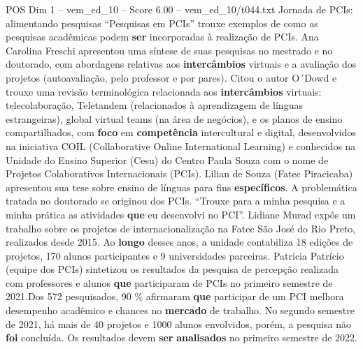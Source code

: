 \begin{textsample}{POS Dim 1 – vem\_ed\_10 – Score 6.00 – vem\_ed\_10/t044.txt}  \label{ex:f1_pos_121}
Jornada de PCIs: alimentando pesquisas “Pesquisas em PCIs” trouxe exemplos de como as pesquisas acadêmicas podem \textbf{ser} incorporadas à realização de PCIs.
Ana Carolina Freschi apresentou uma síntese de suas pesquisas no mestrado e no doutorado, com abordagens relativas aos \textbf{intercâmbios} virtuais e a avaliação dos projetos (autoavaliação, pelo professor e por pares).
Citou o autor O´Dowd e trouxe uma revisão terminológica relacionada aos \textbf{intercâmbios} virtuais: telecolaboração, Teletandem (relacionados à aprendizagem de línguas estrangeiras), global virtual teams (na área de negócios), e os planos de ensino compartilhados, com \textbf{foco} em \textbf{competência} intercultural e digital, desenvolvidos na iniciativa COIL (Collaborative Online International Learning) e conhecidos na Unidade do Ensino Superior (Cesu) do Centro Paula Souza com o nome de Projetos Colaborativos Internacionais (PCIs).
Lilian de Souza (Fatec Piracicaba) apresentou sua tese sobre ensino de línguas para fins \textbf{específicos}.
A problemática tratada no doutorado se originou dos PCIs. “Trouxe para a minha pesquisa e a minha prática as atividades \textbf{que} eu desenvolvi no PCI”.
Lidiane Murad expôs um trabalho sobre os projetos de internacionalização na Fatec São José do Rio Preto, realizados desde 2015.
Ao \textbf{longo} desses anos, a unidade contabiliza 18 edições de projetos, 170 alunos participantes e 9 universidades parceiras.
Patrícia Patrício (equipe dos PCIs) sintetizou os resultados da pesquisa de percepção realizada com professores e alunos \textbf{que} participaram de PCIs no primeiro semestre de 2021.Dos 572 pesquisados, 90 \% afirmaram \textbf{que} participar de um PCI melhora desempenho acadêmico e chances no \textbf{mercado} de trabalho.
No segundo semestre de 2021, há mais de 40 projetos e 1000 alunos envolvidos, porém, a pesquisa não \textbf{foi} concluída.
Os resultados devem \textbf{ser} \textbf{analisados} no primeiro semestre de 2022.

\end{textsample}
